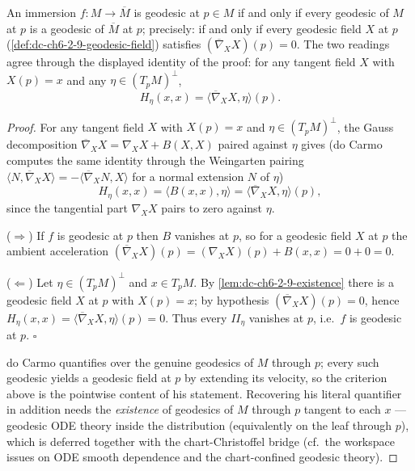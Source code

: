 \begin{proposition}
  \label{prop:dc-ch6-2-9}
  \leanok
  An immersion $f:M\to\overline{M}$ is geodesic at $p\in M$ if and only if every
  geodesic of $M$ at $p$ is a geodesic of $\overline{M}$ at $p$; precisely: if
  and only if every geodesic field $X$ at $p$
  (\cref{def:dc-ch6-2-9-geodesic-field}) satisfies
  $(\overline{\nabla}_X X)(p)=0$. The two readings agree through the displayed
  identity of the proof: for any tangent field $X$ with $X(p)=x$ and any
  $\eta\in(T_pM)^\perp$,
  $$
  H_\eta(x,x)=\langle\overline{\nabla}_X X,\eta\rangle(p).
  $$
\end{proposition}
\begin{proof}
  \leanok
  For any tangent field $X$ with $X(p)=x$ and $\eta\in(T_pM)^\perp$, the Gauss
  decomposition $\overline{\nabla}_X X=\nabla_X X+B(X,X)$ paired against $\eta$
  gives (do Carmo computes the same identity through the Weingarten pairing
  $\langle N,\overline{\nabla}_X X\rangle=-\langle\overline{\nabla}_X N,X\rangle$
  for a normal extension $N$ of $\eta$)
  $$
  H_\eta(x,x)=\langle B(x,x),\eta\rangle=\langle\overline{\nabla}_X X,\eta\rangle(p),
  $$
  since the tangential part $\nabla_X X$ pairs to zero against $\eta$.

  ($\Rightarrow$) If $f$ is geodesic at $p$ then $B$ vanishes at $p$, so for a
  geodesic field $X$ at $p$ the ambient acceleration
  $(\overline{\nabla}_X X)(p)=(\nabla_X X)(p)+B(x,x)=0+0=0$.

  ($\Leftarrow$) Let $\eta\in(T_pM)^\perp$ and $x\in T_pM$. By
  \cref{lem:dc-ch6-2-9-existence} there is a geodesic field $X$ at $p$ with
  $X(p)=x$; by hypothesis $(\overline{\nabla}_X X)(p)=0$, hence
  $H_\eta(x,x)=\langle\overline{\nabla}_X X,\eta\rangle(p)=0$. Thus every
  $\mathit{II}_\eta$ vanishes at $p$, i.e.\ $f$ is geodesic at $p$. $\square$

  do Carmo quantifies over the genuine geodesics of $M$ through $p$; every such
  geodesic yields a geodesic field at $p$ by extending its velocity, so the
  criterion above is the pointwise content of his statement. Recovering his
  literal quantifier in addition needs the \emph{existence} of geodesics of $M$
  through $p$ tangent to each $x$ — geodesic ODE theory inside the distribution
  (equivalently on the leaf through $p$), which is deferred together with the
  chart-Christoffel bridge (cf.\ the workspace issues on ODE smooth dependence
  and the chart-confined geodesic theory).
\end{proof}

